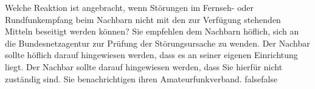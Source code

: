     {Welche Reaktion ist angebracht, wenn Störungen im Fernseh- oder Rundfunkempfang beim Nachbarn nicht mit den zur Verfügung stehenden Mitteln beseitigt werden können?}
    {Sie empfehlen dem Nachbarn höflich, sich an die Bundesnetzagentur zur Prüfung der Störungsursache zu wenden.}
    {Der Nachbar sollte höflich darauf hingewiesen werden, dass es an seiner eigenen Einrichtung liegt.}
    {Der Nachbar sollte darauf hingewiesen werden, dass Sie hierfür nicht zuständig sind.}
    {Sie benachrichtigen ihren Amateurfunkverband.}
    {false}{false}